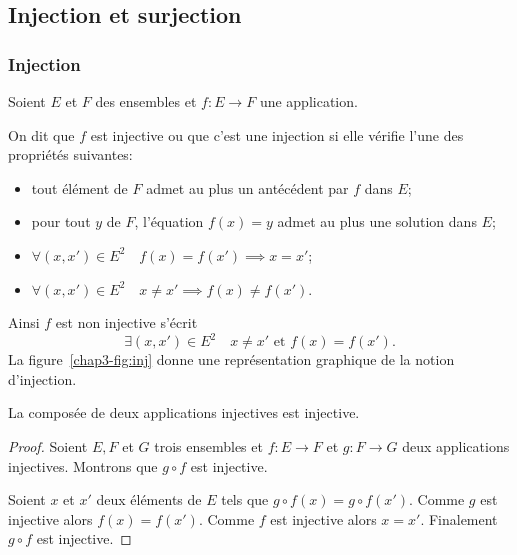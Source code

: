 \subsection{Injection et surjection}
\label{chap3-subsec:injetsurj}
\subsubsection{Injection}
\label{chap3-subsubsec:injection}
Soient \(E\) et \(F\) des ensembles et \(f: E \longrightarrow F\) une application.
\begin{defdef}
  On dit que \(f\) est injective ou que c'est une injection si elle vérifie l'une des propriétés suivantes:
  \begin{itemize}
  \item tout élément de \(F\) admet au plus un antécédent par \(f\) dans \(E\);
  \item pour tout \(y\) de \(F\), l'équation \(f(x)=y\) admet au plus une solution dans \(E\);
  \item \(\forall (x,x') \in E^2 \quad f(x)=f(x') \implies x=x'\);
  \item \(\forall (x,x') \in E^2 \quad  x \neq x' \implies f(x) \neq f(x')\).
  \end{itemize}
  Ainsi \(f\) est non injective s'écrit
  \begin{equation}
    \exists (x,x') \in E^2 \quad x \neq x' \text{~et~} f(x) = f(x').
  \end{equation}
  La figure~\ref{chap3-fig:inj} donne une représentation graphique de la notion d'injection.
\end{defdef}
\begin{theo}
  La composée de deux applications injectives est injective.
\end{theo}
\begin{proof}
  Soient \(E,F\) et \(G\) trois ensembles et \(f:E \longrightarrow F\) et \(g: F \longrightarrow G\) deux applications injectives. Montrons que \(g \circ f\) est injective. 

Soient \(x\) et \(x'\) deux éléments de \(E\) tels que \(g \circ f(x) = g \circ f(x')\). Comme \(g\) est injective alors \(f(x)=f(x')\). Comme \(f\) est injective alors \(x=x'\). Finalement \(g \circ f\) est injective.
\end{proof}
